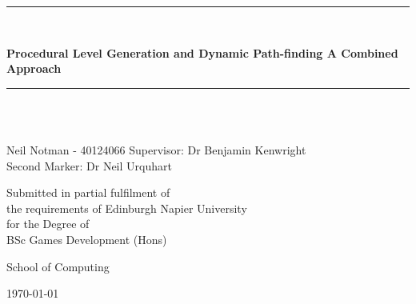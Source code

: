\newcommand{\HRule}{\rule{\linewidth}{0.5mm}}

\begin{titlepage}
	\begin{center}

	\HRule \\[0.4cm]
    	{\Large \bfseries Procedural Level Generation and Dynamic Path-finding A Combined Approach \par}
	\vspace{0.2cm}
	\HRule \\[1.5cm]

	
    	\vspace{3cm}
	\begin{minipage}{0.4\textwidth}
	\begin{center} \large
        \emph{}\\
        	Neil Notman - 40124066
			Supervisor: Dr Benjamin Kenwright\\
			Second Marker: Dr Neil Urquhart
   	 \end{center}
    	\end{minipage}
	
	\vspace{2cm}
    	\begin{minipage}{1\textwidth}
    	\begin{center} \large

		Submitted in partial fulfilment of \\
		the requirements of Edinburgh Napier University \\
		for the Degree of \\
        BSc Games Development (Hons) 
    	\end{center}
    	\end{minipage}

    	\vfill

	\begin{minipage}{1\textwidth}
    	\begin{center} \large
		School of Computing
    	\end{center}
    	\end{minipage}
	
	\vspace{1cm}
    	{\large \today}


	\end{center}
\end{titlepage}
